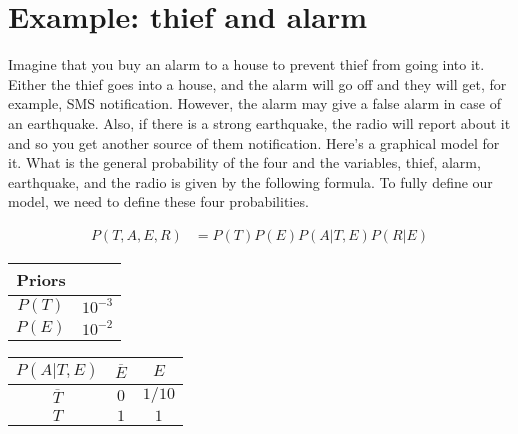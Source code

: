 \documentclass{book}
\begin{document}
\section{Example: thief and alarm}
Imagine that you buy an alarm to a house to prevent thief from going into it. Either the thief goes into a house, and the alarm will go off and they will get, for example, SMS notification. However, the alarm may give a false alarm in case of an earthquake. Also, if there is a strong earthquake, the radio will report about it and so you get another source of them notification. Here's a graphical model for it. What is the general probability of the four and the variables, thief, alarm, earthquake, and the radio is given by the following formula. To fully define our model, we need to define these four probabilities.

\begin{figure}[h]
\centering
{}
\end{figure}

\begin{align*}
P(T,A,E,R) &= P(T)P(E)P(A \vert T,E) P(R \vert E)
\end{align*}


\begin{center}
\begin{tabular}{|| c | c ||}
 \hline
 Priors & \\ 
 \hline\hline
 $P(T)$ & $10^{-3}$ \\  
 $P(E)$ & $10^{-2}$ \\ 
 \hline
\end{tabular}
\end{center}

\begin{center}
\begin{tabular}{|| c | c c ||}
 \hline
 $P(A \vert T, E)$ & $\overline{E}$ &  $E$ \\ 
 \hline\hline
 $\overline{T}$ & $0$ & $1/10$ \\  
 $T$ & $1$ & $1$ \\ 
 \hline
\end{tabular}
\end{center}
\end{document}

